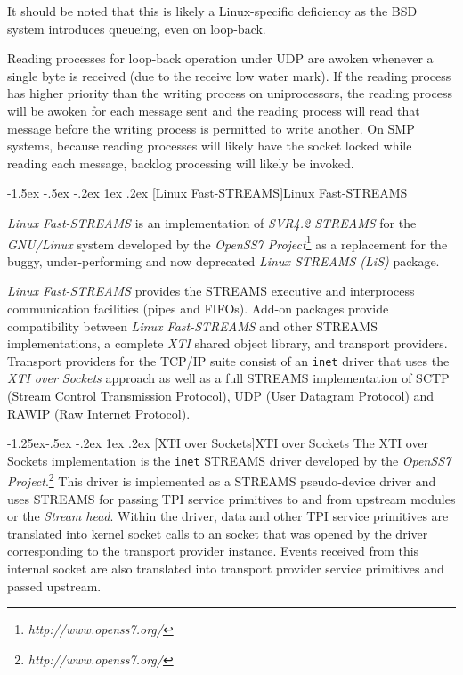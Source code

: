 \documentclass[letterpaper,final,notitlepage,twocolumn,10pt,twoside]{article}
\makeatletter
\let\normalsize\small
\let\small\footnotesize
\let\footnotesize\scriptsize
\let\scriptsize\tiny
\renewcommand\subsection{\@startsection{subsection}{2}{\z@}%
                                     {-1.5ex \@plus -.5ex \@minus -.2ex}%
                                     {1ex \@plus .2ex}%
                                     {\normalfont\normalsize\bfseries}}
\renewcommand\subsubsection{\@startsection{subsubsection}{3}{\z@}%
                                     {-1.25ex\@plus -.5ex \@minus -.2ex}%
                                     {1ex \@plus .2ex}%
                                     {\normalfont\normalsize\bfseries}}
\makeatother
\begin{document}
It should be noted that this is likely a Linux-specific deficiency as the BSD
system introduces queueing, even on loop-back.

Reading processes for loop-back operation under UDP are awoken whenever a
single byte is received (due to the receive low water mark).  If the reading
process has higher priority than the writing process on uniprocessors, the
reading process will be awoken for each message sent and the reading process
will read that message before the writing process is permitted to write
another.  On SMP systems, because reading processes will likely have the
socket locked while reading each message, backlog processing will likely be
invoked.

\subsection[Linux Fast-STREAMS]{Linux Fast-STREAMS}

\textsl{Linux Fast-STREAMS} is an implementation of \textsl{SVR4.2 STREAMS}
for the \textsl{GNU/Linux} system developed by the \textsl{OpenSS7
Project}\footnote{\it http://www.openss7.org/} as a replacement for the
buggy, under-performing and now deprecated \textsl{Linux STREAMS (LiS)}
package.

\textsl{Linux Fast-STREAMS} provides the STREAMS executive and interprocess
communication facilities (pipes and FIFOs).  Add-on packages provide
compatibility between \textsl{Linux Fast-STREAMS} and other STREAMS
implementations, a complete \textsl{XTI} shared object library, and transport
providers.  Transport providers for the TCP/IP suite consist of an
\texttt{inet} driver that uses the \textit{XTI over Sockets} approach as well
as a full STREAMS implementation of SCTP (Stream Control Transmission
Protocol), UDP (User Datagram Protocol) and RAWIP (Raw Internet Protocol).

\subsubsection[XTI over Sockets]{XTI over Sockets} The XTI over Sockets
implementation is the \texttt{inet} STREAMS driver developed by the
\textsl{OpenSS7 Project}.\footnote{\textit{http://www.openss7.org/}}  This
driver is implemented as a STREAMS pseudo-device driver and uses STREAMS for
passing TPI service primitives to and from upstream modules or the
\textit{Stream head}.  Within the driver, data and other TPI service
primitives are translated into kernel socket calls to an socket that was
opened by the driver corresponding to the transport provider instance.  Events
received from this internal socket are also translated into transport provider
service primitives and passed upstream.
\end{document}
